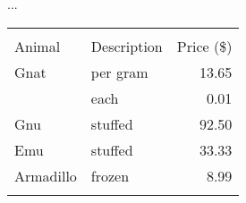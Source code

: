 ...
\begin{tabular}{llr}
\firsthline
\multicolumn{2}{c}{Item} \\
\cline{1-2}
Animal    & Description & Price (\$) \\
\hline
Gnat      & per gram    & 13.65      \\
          & each        & 0.01       \\
Gnu       & stuffed     & 92.50      \\
Emu       & stuffed     & 33.33      \\
Armadillo & frozen      & 8.99       \\
\lasthline
\end{tabular}


